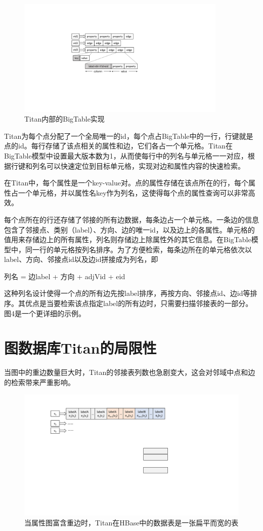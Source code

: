 \begin{figure}[htbp]
\centering
\includegraphics[width=100mm]{fig/adj_list.pdf}
\caption{Titan内部的BigTable实现}
\label{fig:adj_list}
\end{figure}

Titan为每个点分配了一个全局唯一的id，每个点占BigTable中的一行，行键就是点的id。每行存储了该点相关的属性和边，它们各占一个单元格。Titan在BigTable模型中设置最大版本数为1，从而使每行中的列名与单元格一一对应，根据行键和列名可以快速定位到目标单元格，实现对边和属性内容的快速检索。

在Titan中，每个属性是一个key-value对。点的属性存储在该点所在的行，每个属性占一个单元格，并以属性名key作为列名，这使得每个点的属性查询可以非常高效。

每个点所在的行还存储了邻接的所有边数据，每条边占一个单元格。一条边的信息包含了邻接点、类别（label）、方向、边的唯一id，以及边上的各属性。单元格的值用来存储边上的所有属性，列名则存储边上除属性外的其它信息。在BigTable模型中，同一行的单元格按列名排序。为了方便检索，每条边所在的单元格依次以label、方向、邻接点id以及边id拼接成为列名，即
\begin{center}
  列名 = 边label + 方向 + adjVid + eid
\end{center}
这种列名设计使得一个点的所有边先按label排序，再按方向、邻接点id、边id等排序。其优点是当要检索该点指定label的所有边时，只需要扫描邻接表的一部分。图4是一个更详细的示例。

\section{图数据库Titan的局限性}
当图中的重边数量巨大时，Titan的邻接表列数也急剧变大，这会对邻域中点和边的检索带来严重影响。

\begin{figure}[htbp]
\centering
\includegraphics[width=150mm]{fig/original_list.pdf}
\caption{当属性图富含重边时，Titan在HBase中的数据表是一张扁平而宽的表}
\label{fig:orginal_list}
\end{figure}


